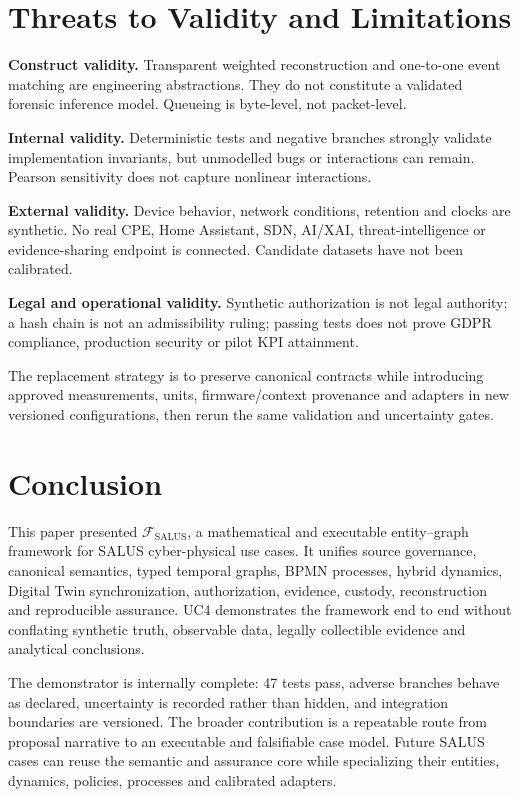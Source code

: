 ﻿\documentclass[10pt,a4paper,twocolumn]{article}
\newcommand{\Framework}{\mathcal{F}_{\mathrm{SALUS}}}
\begin{document}
\section{Threats to Validity and Limitations}

\textbf{Construct validity.} Transparent weighted reconstruction and one-to-one event matching are engineering abstractions. They do not constitute a validated forensic inference model. Queueing is byte-level, not packet-level.

\textbf{Internal validity.} Deterministic tests and negative branches strongly validate implementation invariants, but unmodelled bugs or interactions can remain. Pearson sensitivity does not capture nonlinear interactions.

\textbf{External validity.} Device behavior, network conditions, retention and clocks are synthetic. No real CPE, Home Assistant, SDN, AI/XAI, threat-intelligence or evidence-sharing endpoint is connected. Candidate datasets have not been calibrated.

\textbf{Legal and operational validity.} Synthetic authorization is not legal authority; a hash chain is not an admissibility ruling; passing tests does not prove GDPR compliance, production security or pilot KPI attainment.

The replacement strategy is to preserve canonical contracts while introducing approved measurements, units, firmware/context provenance and adapters in new versioned configurations, then rerun the same validation and uncertainty gates.

\section{Conclusion}

This paper presented \(\Framework\), a mathematical and executable entity--graph framework for SALUS cyber-physical use cases. It unifies source governance, canonical semantics, typed temporal graphs, BPMN processes, hybrid dynamics, Digital Twin synchronization, authorization, evidence, custody, reconstruction and reproducible assurance. UC4 demonstrates the framework end to end without conflating synthetic truth, observable data, legally collectible evidence and analytical conclusions.

The demonstrator is internally complete: 47 tests pass, adverse branches behave as declared, uncertainty is recorded rather than hidden, and integration boundaries are versioned. The broader contribution is a repeatable route from proposal narrative to an executable and falsifiable case model. Future SALUS cases can reuse the semantic and assurance core while specializing their entities, dynamics, policies, processes and calibrated adapters.
\end{document}
